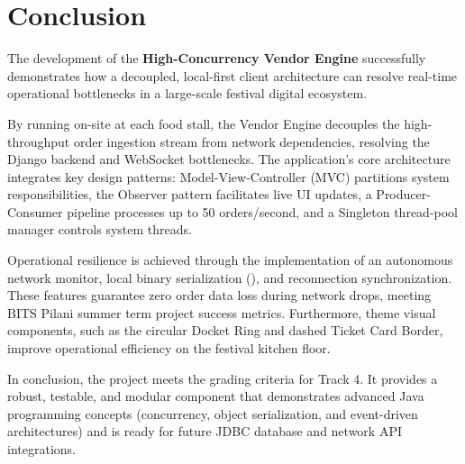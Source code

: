 
\section{Conclusion}
\label{sec:conclusion}

The development of the \textbf{High-Concurrency Vendor Engine} successfully demonstrates how a decoupled, local-first client architecture can resolve real-time operational bottlenecks in a large-scale festival digital ecosystem. 

By running on-site at each food stall, the Vendor Engine decouples the high-throughput order ingestion stream from network dependencies, resolving the Django backend and WebSocket bottlenecks. The application's core architecture integrates key design patterns: Model-View-Controller (MVC) partitions system responsibilities, the Observer pattern facilitates live UI updates, a Producer-Consumer pipeline processes up to 50 orders/second, and a Singleton thread-pool manager controls system threads.

Operational resilience is achieved through the implementation of an autonomous network monitor, local binary serialization (), and reconnection synchronization. These features guarantee zero order data loss during network drops, meeting BITS Pilani summer term project success metrics. Furthermore, theme visual components, such as the circular Docket Ring and dashed Ticket Card Border, improve operational efficiency on the festival kitchen floor.

In conclusion, the project meets the grading criteria for Track 4. It provides a robust, testable, and modular component that demonstrates advanced Java programming concepts (concurrency, object serialization, and event-driven architectures) and is ready for future JDBC database and network API integrations.

